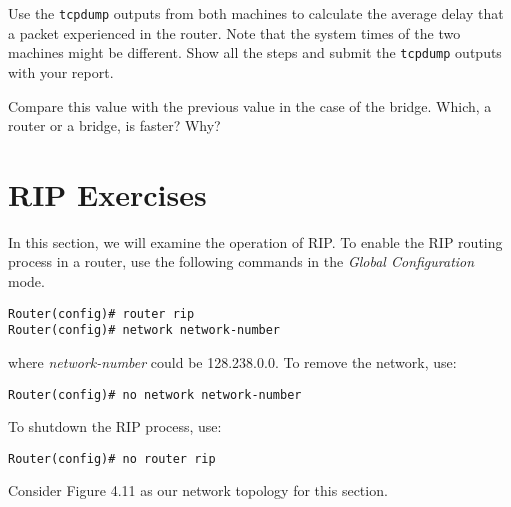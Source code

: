 \documentclass{../UTNetLab}
\begin{document}
    \begin{report}
    \item Use the \lstinline{tcpdump} outputs from both machines to calculate the average delay that a packet experienced in the router. Note that the system times of the two machines might be different. Show all the steps and submit the \lstinline{tcpdump} outputs with your report.
    
    \item Compare this value with the previous value in the case of the bridge. Which, a router or a bridge, is faster? Why?
    \end{report}


\part{RIP Exercises}
    In this section, we will examine the operation of RIP. To enable the RIP routing process in a router, use the following commands in the \textit{Global Configuration} mode.
    \begin{lstlisting}[language={cisco}, emph={network-number}]
Router(config)# router rip
Router(config)# network network-number
    \end{lstlisting}
    where \textit{network-number} could be 128.238.0.0.
    To remove the network, use:
    \begin{lstlisting}[language={cisco}, emph={network-number}]
Router(config)# no network network-number
    \end{lstlisting}
    To shutdown the RIP process, use:
    \begin{lstlisting}[language={cisco}]
Router(config)# no router rip
    \end{lstlisting}
    Consider Figure 4.11 as our network topology for this section.
    
\end{document}
